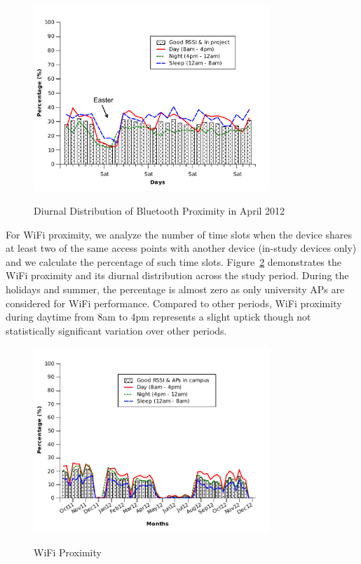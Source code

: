 \begin{figure}[tbp]
\centering 
{\includegraphics[width=3.5in]{graphs/bluetooth_201204_tag.pdf}}
\caption{Diurnal Distribution of Bluetooth Proximity in April 2012} 
\label{fig:diurnal_april}
\end{figure} 

For WiFi proximity, we analyze the number of time slots when the device shares at least two of the same access points with another device (in-study devices only) and we calculate the percentage of such time slots. Figure~\ref{fig:wifi} demonstrates the WiFi proximity and its diurnal distribution across the study period. During the holidays and summer, the percentage is almost zero as only university APs are considered for WiFi performance. Compared to other periods, WiFi proximity during daytime from 8am to 4pm represents a slight uptick though not statistically significant variation over other periods. 

\begin{figure}[tbp]
\centering 
{\includegraphics[width=3.5in]{graphs/weekly_wifi.pdf}}
\caption{WiFi Proximity} 
\label{fig:wifi}
\end{figure} 

